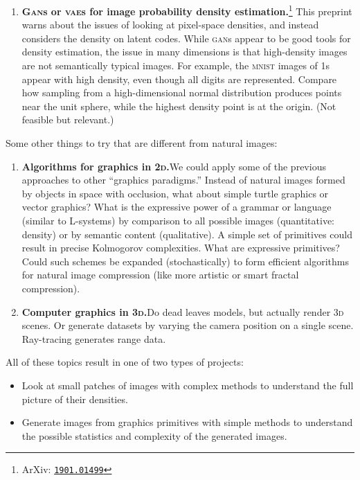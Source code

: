 \documentclass[../notebook.tex]{subfiles}
\begin{document}
\begin{enumerate}
  \item \textbf{\textsc{Gan}s or \textsc{vae}s for image probability
      density estimation.}\footnote{ArXiv:
    \href{https://arxiv.org/abs/1901.01499}{\texttt{1901.01499}}}\@
    This preprint warns about the issues of looking at pixel-space densities,
    and instead considers the density on latent codes. While \textsc{gan}s
    appear to be good tools for density estimation, the issue in many dimensions
    is that high-density images are not semantically typical images. For
    example, the \textsc{mnist} images of 1s appear with high density, even
    though all digits are represented. Compare how sampling from a
    high-dimensional normal distribution produces points near the unit sphere,
    while the highest density point is at the origin. (Not feasible but
    relevant.)
\end{enumerate}
Some other things to try that are different from natural images:
\begin{enumerate}
  \item \textbf{Algorithms for graphics in \textsc{2d}.}\@ We could apply some
    of the previous approaches to other ``graphics paradigms.'' Instead of
    natural images formed by objects in space with occlusion, what about simple
    turtle graphics or vector graphics? What is the expressive power of a
    grammar or language (similar to L-systems) by comparison to all possible
    images (quantitative: density) or by semantic content (qualitative). A
    simple set of primitives could result in precise Kolmogorov complexities.
    What are expressive primitives? Could such schemes be expanded
    (stochastically) to form efficient algorithms for natural image compression
    (like more artistic or smart fractal compression).

  \item \textbf{Computer graphics in \textsc{3d}.}\@ Do dead leaves models, but
    actually render \textsc{3d} scenes. Or generate datasets by varying the
    camera position on a single scene. Ray-tracing generates range data.
\end{enumerate}
All of these topics result in one of two types of projects:
\begin{itemize}
  \item Look at small patches of images with complex methods to understand the
    full picture of their densities.

  \item Generate images from graphics primitives with simple methods to
    understand the possible statistics and complexity of the generated images.
\end{itemize}
\end{document}
